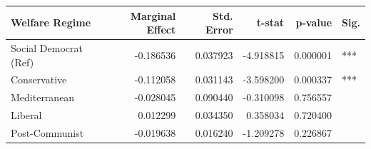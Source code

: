 \begin{tabular}{lrrrrl}
\toprule
Welfare Regime & Marginal Effect & Std. Error & t-stat & p-value & Sig. \\
\midrule
Social Democrat (Ref) & -0.186536 & 0.037923 & -4.918815 & 0.000001 & *** \\
Conservative & -0.112058 & 0.031143 & -3.598200 & 0.000337 & *** \\
Mediterranean & -0.028045 & 0.090440 & -0.310098 & 0.756557 &  \\
Liberal & 0.012299 & 0.034350 & 0.358034 & 0.720400 &  \\
Post-Communist & -0.019638 & 0.016240 & -1.209278 & 0.226867 &  \\
\bottomrule
\end{tabular}
